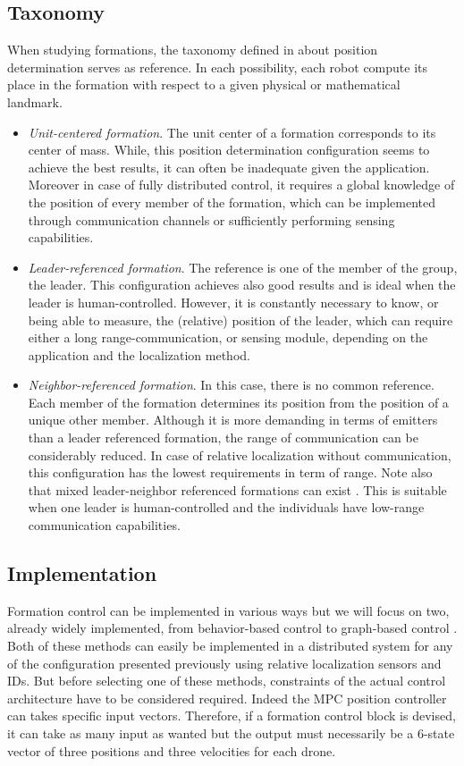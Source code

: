 \documentclass[a4paper, 12pt]{report}
\begin{document}
\subsection{Taxonomy}
When studying formations, the taxonomy defined in \cite{Arkin1999} about position determination serves as reference. In each possibility, each robot compute its place in the formation with respect to a given physical or mathematical landmark.
\begin{itemize}
\item \emph{Unit-centered formation}. The unit center of a formation corresponds to its center of mass. While, this position determination configuration seems to achieve the best results, it can often be inadequate given the application. Moreover in case of fully distributed control, it requires a global knowledge of the position of every member of the formation, which can be implemented through communication channels or sufficiently performing sensing capabilities.
\item \emph{Leader-referenced formation}. The reference is one of the member of the group, the leader. This configuration achieves also good results and is ideal when the leader is human-controlled. However, it is constantly necessary to know, or being able to measure, the (relative) position of the leader, which can require either a long range-communication, or sensing module, depending on the application and the localization method.
\item \emph{Neighbor-referenced formation}. In this case, there is no common reference. Each member of the formation determines its position from the position of a unique other member. Although it is more demanding in terms of emitters than a leader referenced formation, the range of communication can be considerably reduced. In case of relative localization without communication, this configuration has the lowest requirements in term of range. Note also that mixed leader-neighbor referenced formations can exist \cite{Mataric2002}. This is suitable when one leader is human-controlled and the individuals have low-range communication capabilities.
\end{itemize}

\subsection{Implementation}
Formation control can be implemented in various ways but we will focus on two, already widely implemented, from behavior-based control \cite{Arkin1999, Mataric2002, Pugh2009} to graph-based control  \cite{Gowal2013, Falconi2010}. Both of these methods can easily be implemented in a distributed system for any of the configuration presented previously using relative localization sensors and IDs. But before selecting one of these methods, constraints of the actual control architecture have to be considered required. Indeed the MPC position controller can takes specific input vectors. Therefore, if a formation control block is devised, it can take as many input as wanted but the output must necessarily be a 6-state vector of three positions and three velocities for each drone.
\end{document}

